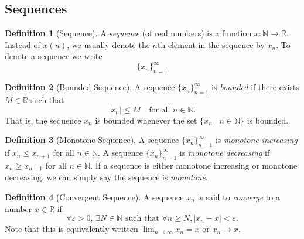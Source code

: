 \documentclass{article}
\theoremstyle{definition}
\newtheorem{definition}{Definition}[section]
\theoremstyle{remark}
\begin{document}
\subsection{Sequences}




\begin{definition}[Sequence] \label{def:sequence}
A \textit{sequence} (of real numbers) is a function \( x : \mathbb{N} \to \mathbb{R} \). Instead of \( x(n) \), we usually denote the \( n \)th element in the sequence by \(x_n\). To denote a sequence we write 
\[
\{x_n\}_{n=1}^{\infty}
\]
\end{definition}






\begin{definition}[Bounded Sequence] \label{def:bounded sequence}
A sequence \( \{x_n\}_{n=1}^{\infty}\) is \textit{bounded} if there exists \( M \in \mathbb{R}\) such that 
\[
|x_n| \leq M \quad \text{for all } n \in \mathbb{N}.
\]
That is, the sequence \(x_n\) is bounded whenever the set $\{ x_n \mid n \in \mathbb{N} \}$ is bounded.
\end{definition}









\begin{definition}[Monotone Sequence]\label{def:Monotone_sequence}
A sequence \(\{x_n\}_{n=1}^{\infty}\) is \textit{monotone increasing} if \( x_n \leq x_{n+1} \) for all \( n \in \mathbb{N} \). A sequence \(\{x_n\}_{n=1}^{\infty}\) is \textit{monotone decreasing} if \( x_n \geq x_{n+1} \) for all \( n \in \mathbb{N} \). If a sequence is either monotone increasing or monotone decreasing, we can simply say the sequence is \textit{monotone}.
\end{definition}







\begin{definition}[Convergent Sequence] \label{def:convergent_sequence}
A sequence \(x_n\) is said to \textit{converge} to a number \( x \in \mathbb{R}\) if 
\[
\forall \varepsilon > 0, \, \exists N \in \mathbb{N} \text{ such that } \forall n \geq N, |x_n - x| < \varepsilon.
\]
Note that this is equivalently written \( \lim_{n \to \infty} x_n = x\) or \(x_n \longrightarrow x \).

\end{definition}
\end{document}
